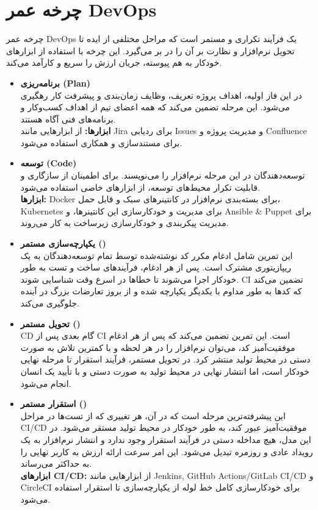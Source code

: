 \section{چرخه عمر DevOps}
چرخه عمر DevOps یک فرآیند تکراری و مستمر است که مراحل مختلفی از ایده تا تحویل نرم‌افزار و نظارت بر آن را در بر می‌گیرد. این چرخه با استفاده از ابزارهای خودکار به هم پیوسته، جریان ارزش را سریع و کارآمد می‌کند.

\begin{itemize}
    \item \textbf{برنامه‌ریزی (Plan)} \\
    در این فاز اولیه، اهداف پروژه تعریف، وظایف زمان‌بندی و پیشرفت کار رهگیری می‌شود. این مرحله تضمین می‌کند که همه اعضای تیم از اهداف کسب‌وکار و برنامه‌های فنی آگاه هستند. \\
    \textbf{ابزارها:} از ابزارهایی مانند Jira برای ردیابی Issues و مدیریت پروژه و Confluence برای مستندسازی و همکاری استفاده می‌شود.

    \item \textbf{توسعه (Code)} \\
    توسعه‌دهندگان در این مرحله نرم‌افزار را می‌نویسند. برای اطمینان از سازگاری و قابلیت تکرار محیط‌های توسعه، از ابزارهای خاصی استفاده می‌شود. \\
    \textbf{ابزارها:} Docker برای بسته‌بندی نرم‌افزار در کانتینرهای سبک و قابل حمل، Kubernetes برای مدیریت و خودکارسازی این کانتینرها، و Ansible \& Puppet برای مدیریت پیکربندی و خودکارسازی زیرساخت به کار می‌روند.

    \item \textbf{یکپارچه‌سازی مستمر ()} \\
    این تمرین شامل ادغام مکرر کد نوشته‌شده توسط تمام توسعه‌دهندگان به یک ریپازیتوری مشترک است. پس از هر ادغام، فرآیندهای ساخت و تست به طور خودکار اجرا می‌شوند تا خطاها در اسرع وقت شناسایی شوند. CI تضمین می‌کند که کدها به طور مداوم با یکدیگر یکپارچه شده و از بروز تعارضات بزرگ در آینده جلوگیری می‌کند.

    \item \textbf{تحویل مستمر ()} \\
    CD گام بعدی پس از CI است. این تمرین تضمین می‌کند که پس از هر ادغام موفقیت‌آمیز کد، می‌توان نرم‌افزار را در هر لحظه و با کمترین تلاش به صورت دستی در محیط تولید منتشر کرد. در تحویل مستمر، فرآیند استقرار تا مرحله نهایی خودکار است، اما انتشار نهایی در محیط تولید به صورت دستی و با تأیید یک انسان انجام می‌شود.

    \item \textbf{استقرار مستمر ()} \\
    این پیشرفته‌ترین مرحله است که در آن، هر تغییری که از تست‌ها در مراحل CI/CD موفقیت‌آمیز عبور کند، به طور خودکار در محیط تولید مستقر می‌شود. در این مدل، هیچ مداخله دستی در فرآیند استقرار وجود ندارد و انتشار نرم‌افزار به یک رویداد عادی و روزمره تبدیل می‌شود. این امر سرعت ارائه ارزش به کاربر نهایی را به حداکثر می‌رساند. \\
    \textbf{ابزارهای CI/CD:} از ابزارهایی مانند Jenkins, GitHub Actions/GitLab CI/CD و CircleCI برای خودکارسازی کامل خط لوله از یکپارچه‌سازی تا استقرار استفاده می‌شود.


\end{itemize}
